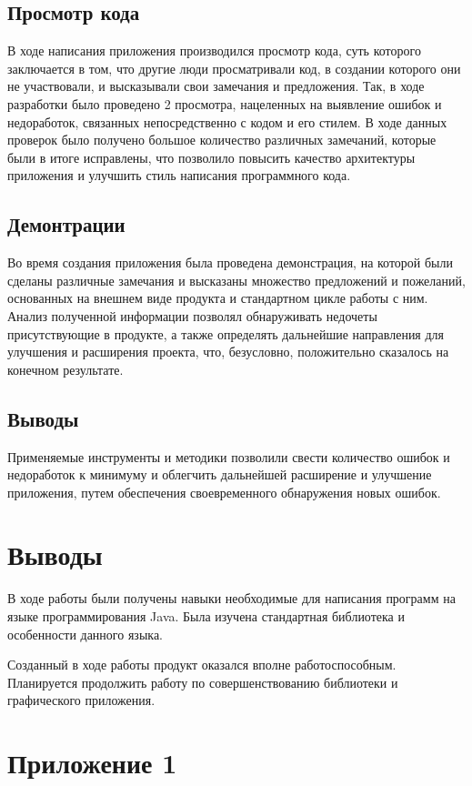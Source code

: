 \subsection{Просмотр кода}

В ходе написания приложения производился просмотр кода, суть которого заключается в том, что другие люди просматривали код, в создании которого они не участвовали, и высказывали свои замечания и предложения. Так, в ходе разработки было проведено 2 просмотра, нацеленных на выявление ошибок и недоработок, связанных  непосредственно с кодом и его стилем. В ходе данных проверок было получено большое количество различных замечаний, которые были в итоге исправлены, что позволило повысить качество архитектуры приложения и улучшить стиль написания программного кода.

\subsection{Демонтрации}

Во время создания приложения была проведена демонстрация, на которой были сделаны различные замечания и высказаны множество предложений и пожеланий, основанных на внешнем виде продукта и стандартном цикле работы с ним. Анализ полученной информации позволял обнаруживать недочеты присутствующие в продукте, а также определять дальнейшие направления для улучшения и расширения проекта, что, безусловно, положительно сказалось на конечном результате.

\subsection{Выводы}
Применяемые инструменты и методики позволили свести количество ошибок и недоработок к минимуму и облегчить дальнейшей расширение и улучшение приложения, путем обеспечения своевременного обнаружения новых ошибок. 

\section{Выводы}
В ходе работы были получены навыки необходимые для написания программ на языке программирования Java. Была изучена стандартная библиотека и особенности данного языка.

Созданный в ходе работы продукт оказался вполне работоспособным. Планируется продолжить работу по совершенствованию библиотеки и графического приложения. 
\section{Приложение 1}
\label{sec:listings}

